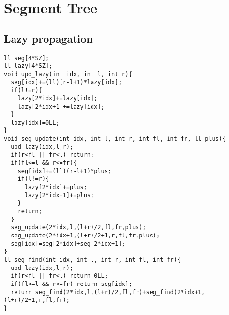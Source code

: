 \documentclass[landscape, 8pt, a4paper, oneside, twocolumn]{extarticle}
\begin{document}
{
\large
\tableofcontents
}
\pagebreak

\section{Segment Tree}
\subsection{Lazy propagation}
\begin{verbatim}
ll seg[4*SZ];  
ll lazy[4*SZ];
void upd_lazy(int idx, int l, int r){
  seg[idx]+=(ll)(r-l+1)*lazy[idx];
  if(l!=r){
    lazy[2*idx]+=lazy[idx];
    lazy[2*idx+1]+=lazy[idx];
  }
  lazy[idx]=0LL;
}
void seg_update(int idx, int l, int r, int fl, int fr, ll plus){
  upd_lazy(idx,l,r);
  if(r<fl || fr<l) return;
  if(fl<=l && r<=fr){
    seg[idx]+=(ll)(r-l+1)*plus;
    if(l!=r){
      lazy[2*idx]+=plus;
      lazy[2*idx+1]+=plus;
    }
    return;
  }
  seg_update(2*idx,l,(l+r)/2,fl,fr,plus);
  seg_update(2*idx+1,(l+r)/2+1,r,fl,fr,plus);
  seg[idx]=seg[2*idx]+seg[2*idx+1];
}
ll seg_find(int idx, int l, int r, int fl, int fr){
  upd_lazy(idx,l,r);
  if(r<fl || fr<l) return 0LL;
  if(fl<=l && r<=fr) return seg[idx];
  return seg_find(2*idx,l,(l+r)/2,fl,fr)+seg_find(2*idx+1,(l+r)/2+1,r,fl,fr);
}
\end{verbatim}
\end{document}
